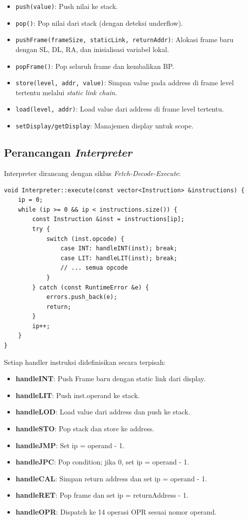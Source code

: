 \documentclass[12pt,a4paper]{article}
\begin{document}
\begin{itemize}
    \item \texttt{push(value)}: Push nilai ke stack.
    \item \texttt{pop()}: Pop nilai dari stack (dengan deteksi underflow).
    \item \texttt{pushFrame(frameSize, staticLink, returnAddr)}: Alokasi frame
        baru dengan SL, DL, RA, dan inisialisasi variabel lokal.
    \item \texttt{popFrame()}: Pop seluruh frame dan kembalikan BP.
    \item \texttt{store(level, addr, value)}: Simpan value pada address di
        frame level tertentu melalui \textit{static link chain}.
    \item \texttt{load(level, addr)}: Load value dari address di frame level
        tertentu.
    \item \texttt{setDisplay/getDisplay}: Manajemen display untuk scope.
\end{itemize}

\subsection{Perancangan \textit{Interpreter}}

Interpreter dirancang dengan siklus \textit{Fetch-Decode-Execute}:

\begin{lstlisting}[style=cpp, caption={Siklus utama interpreter}]
void Interpreter::execute(const vector<Instruction> &instructions) {
    ip = 0;
    while (ip >= 0 && ip < instructions.size()) {
        const Instruction &inst = instructions[ip];
        try {
            switch (inst.opcode) {
                case INT: handleINT(inst); break;
                case LIT: handleLIT(inst); break;
                // ... semua opcode
            }
        } catch (const RuntimeError &e) {
            errors.push_back(e);
            return;
        }
        ip++;
    }
}
\end{lstlisting}

Setiap handler instruksi didefinisikan secara terpisah:

\begin{itemize}
    \item \textbf{handleINT}: Push Frame baru dengan static link dari display.
    \item \textbf{handleLIT}: Push inst.operand ke stack.
    \item \textbf{handleLOD}: Load value dari address dan push ke stack.
    \item \textbf{handleSTO}: Pop stack dan store ke address.
    \item \textbf{handleJMP}: Set ip = operand - 1.
    \item \textbf{handleJPC}: Pop condition; jika 0, set ip = operand - 1.
    \item \textbf{handleCAL}: Simpan return address dan set ip = operand - 1.
    \item \textbf{handleRET}: Pop frame dan set ip = returnAddress - 1.
    \item \textbf{handleOPR}: Dispatch ke 14 operasi OPR sesuai nomor operand.
\end{itemize}
\end{document}
